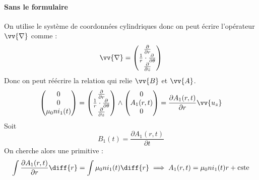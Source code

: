 \paragraph*{Sans le formulaire}
On utilise le système de coordonnées cylindriques donc on peut écrire l'opérateur $\vv{\nabla}$ comme :
\begin{equation}
  \vv{\nabla} =
  \begin{pmatrix}
    \frac{\partial}{\partial r}\\
    \frac{1}{r} \cdot \frac{\partial}{\partial \theta}\\
    \frac{\partial}{\partial z}
  \end{pmatrix}
\end{equation}
Donc on peut réécrire la relation qui relie $\vv{B}$ et $\vv{A}$.
\begin{equation}
    \begin{pmatrix} 0 \\ 0 \\ \mu_0 n i_1(t) \end{pmatrix} =
    \begin{pmatrix}
      \frac{\partial}{\partial r}\\
      \frac{1}{r} \cdot \frac{\partial}{\partial \theta}\\
      \frac{\partial}{\partial z}
    \end{pmatrix} \wedge \begin{pmatrix}
      0 \\ A_1(r,t) \\ 0
    \end{pmatrix}
    =
    \frac{\partial A_1 (r,t)}{\partial r} \vv{u_z}
\end{equation}
Soit
\begin{equation}
  B_1(t) = \frac{\partial A_1(r,t)}{\partial t}
\end{equation}
On cherche alors une primitive :
\begin{equation}
  \int \frac{\partial A_1 (r,t)}{\partial r}\diff{r} = \int \mu_0 n i_1 (t) \diff{r}
  \implies A_1 (r,t) = \mu_0 n i_1 (t) r + \text{cste}
\end{equation}

